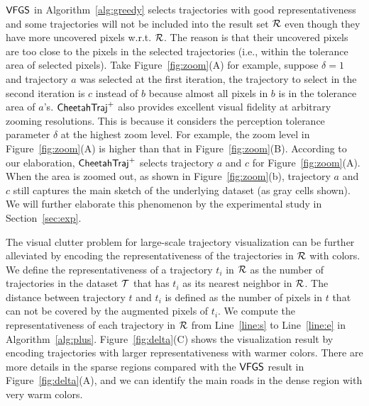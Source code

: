 

$\mathsf{VFGS}$ in Algorithm~\ref{alg:greedy} selects trajectories with good representativeness and some trajectories will not be included into the result set $\mathcal{R}$ even though they have more uncovered pixels w.r.t. $\mathcal{R}$. The reason is that their uncovered pixels are too close to the pixels in the selected trajectories (i.e., within the tolerance area of selected pixels). Take Figure~\ref{fig:zoom}(A) for example, suppose $\delta=1$ and trajectory $a$ was selected at the first iteration, the trajectory to select in the second iteration is $c$ instead of $b$ because almost all pixels in $b$ is in the tolerance area of $a$'s. $\mathsf{CheetahTraj}^{+}$ also provides excellent visual fidelity at arbitrary zooming resolutions. This is because it considers the perception tolerance parameter $\delta$  at the highest zoom level. For example, the zoom level in Figure~\ref{fig:zoom}(A) is higher than that in Figure~\ref{fig:zoom}(B).
According to our elaboration, $\mathsf{CheetahTraj}^{+}$ selects trajectory $a$ and $c$ for Figure~\ref{fig:zoom}(A).
When the area is zoomed out, as shown in Figure~\ref{fig:zoom}(b), trajectory $a$ and $c$ still captures the main sketch of the underlying dataset (as gray cells shown).
We will further elaborate this phenomenon by the experimental study in Section~\ref{sec:exp}.



The visual clutter problem for large-scale trajectory visualization can be further alleviated by encoding the representativeness of the trajectories in $\mathcal{R}$ with colors. We define the representativeness of a trajectory $t_i$ in $\mathcal{R}$ as the number of trajectories in the dataset $\mathcal{T}$ that has $t_i$ as its nearest neighbor in $\mathcal{R}$. The distance between trajectory $t$ and $t_i$ is defined as the number of pixels in $t$ that can not be covered by the augmented pixels of $t_i$. We compute the representativeness of each trajectory in $\mathcal{R}$ from Line~\ref{line:s} to Line~\ref{line:e} in Algorithm~\ref{alg:plus}. Figure~\ref{fig:delta}(C) shows the visualization result by encoding trajectories with larger representativeness with warmer colors. There are more details in the sparse regions compared with the $\mathsf{VFGS}$ result in Figure~\ref{fig:delta}(A), and we can identify the main roads in the dense region with very warm colors.


